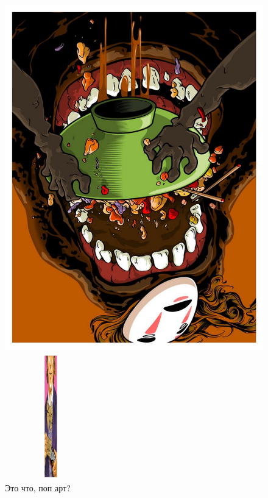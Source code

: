 \documentclass[12pt, a4paper]{article}
\begin{document}
\begin{figure}[h!]
\begin{minipage}[h!]{0.3\linewidth}
\includegraphics[scale=0.15,angle=180]{pop6.pdf}
\end{minipage}
\hfill
\begin{minipage}[h!]{0.3\linewidth}
\includegraphics[scale=2,width=4cm,height=5.5cm]{pop7.pdf}
\end{minipage}
\caption{Это что, поп арт?}
\label{fig:1figs}
\end{figure}
\end{document}
